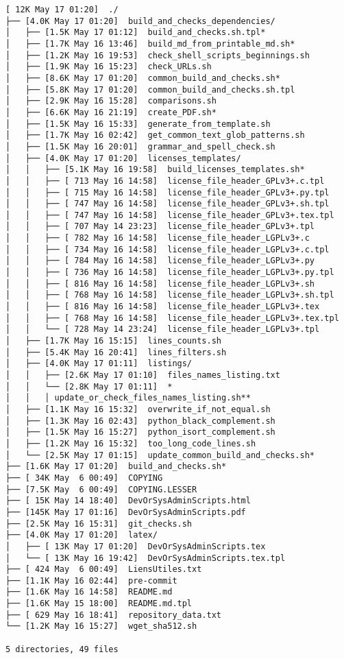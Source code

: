 \documentclass{article}
\begin{document}
\begin{verbatim}
[ 12K May 17 01:20]  ./
├── [4.0K May 17 01:20]  build_and_checks_dependencies/
│   ├── [1.5K May 17 01:12]  build_and_checks.sh.tpl*
│   ├── [1.7K May 16 13:46]  build_md_from_printable_md.sh*
│   ├── [1.2K May 16 19:53]  check_shell_scripts_beginnings.sh
│   ├── [1.9K May 16 15:23]  check_URLs.sh
│   ├── [8.6K May 17 01:20]  common_build_and_checks.sh*
│   ├── [5.8K May 17 01:20]  common_build_and_checks.sh.tpl
│   ├── [2.9K May 16 15:28]  comparisons.sh
│   ├── [6.6K May 16 21:19]  create_PDF.sh*
│   ├── [1.5K May 16 15:33]  generate_from_template.sh
│   ├── [1.7K May 16 02:42]  get_common_text_glob_patterns.sh
│   ├── [1.5K May 16 20:01]  grammar_and_spell_check.sh
│   ├── [4.0K May 17 01:20]  licenses_templates/
│   │   ├── [5.1K May 16 19:58]  build_licenses_templates.sh*
│   │   ├── [ 713 May 16 14:58]  license_file_header_GPLv3+.c.tpl
│   │   ├── [ 715 May 16 14:58]  license_file_header_GPLv3+.py.tpl
│   │   ├── [ 747 May 16 14:58]  license_file_header_GPLv3+.sh.tpl
│   │   ├── [ 747 May 16 14:58]  license_file_header_GPLv3+.tex.tpl
│   │   ├── [ 707 May 14 23:23]  license_file_header_GPLv3+.tpl
│   │   ├── [ 782 May 16 14:58]  license_file_header_LGPLv3+.c
│   │   ├── [ 734 May 16 14:58]  license_file_header_LGPLv3+.c.tpl
│   │   ├── [ 784 May 16 14:58]  license_file_header_LGPLv3+.py
│   │   ├── [ 736 May 16 14:58]  license_file_header_LGPLv3+.py.tpl
│   │   ├── [ 816 May 16 14:58]  license_file_header_LGPLv3+.sh
│   │   ├── [ 768 May 16 14:58]  license_file_header_LGPLv3+.sh.tpl
│   │   ├── [ 816 May 16 14:58]  license_file_header_LGPLv3+.tex
│   │   ├── [ 768 May 16 14:58]  license_file_header_LGPLv3+.tex.tpl
│   │   └── [ 728 May 14 23:24]  license_file_header_LGPLv3+.tpl
│   ├── [1.7K May 16 15:15]  lines_counts.sh
│   ├── [5.4K May 16 20:41]  lines_filters.sh
│   ├── [4.0K May 17 01:11]  listings/
│   │   ├── [2.6K May 17 01:10]  files_names_listing.txt
│   │   └── [2.8K May 17 01:11]  *
│   │   │ update_or_check_files_names_listing.sh**
│   ├── [1.1K May 16 15:32]  overwrite_if_not_equal.sh
│   ├── [1.3K May 16 02:43]  python_black_complement.sh
│   ├── [1.5K May 16 15:27]  python_isort_complement.sh
│   ├── [1.2K May 16 15:32]  too_long_code_lines.sh
│   └── [2.5K May 17 01:15]  update_common_build_and_checks.sh*
├── [1.6K May 17 01:20]  build_and_checks.sh*
├── [ 34K May  6 00:49]  COPYING
├── [7.5K May  6 00:49]  COPYING.LESSER
├── [ 15K May 14 18:40]  DevOrSysAdminScripts.html
├── [145K May 17 01:16]  DevOrSysAdminScripts.pdf
├── [2.5K May 16 15:31]  git_checks.sh
├── [4.0K May 17 01:20]  latex/
│   ├── [ 13K May 17 01:20]  DevOrSysAdminScripts.tex
│   └── [ 13K May 16 19:42]  DevOrSysAdminScripts.tex.tpl
├── [ 424 May  6 00:49]  LiensUtiles.txt
├── [1.1K May 16 02:44]  pre-commit
├── [1.6K May 16 14:58]  README.md
├── [1.6K May 15 18:00]  README.md.tpl
├── [ 629 May 16 18:41]  repository_data.txt
└── [1.2K May 16 15:27]  wget_sha512.sh

5 directories, 49 files
\end{verbatim}
\end{document}
